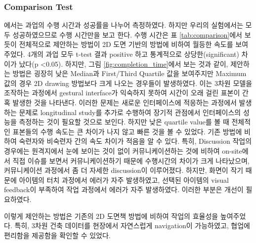 \subsubsection{Comparison Test}
\cite{yeh_-site_2012}에서는 과업의 수행 시간과 성공률을 나누어 측정하였다. 하지만 우리의 실험에서는 모두 성공하였으므로 수행 시간만을 보고 한다. 수행 시간은 표 \ref{tab:comparison}에서 보듯이 전체적으로 제안하는 방법이 2D 도면 기반의 방법에 비하여 월등한 속도를 보여주었다. 4개의 과업 모두 t-test 결과 positive 하고 통계적으로 상당한(significant) 차이가 났다(p \textless 0.05). 하지만, 그림 \ref{fig:completion_time}에서 보는 것과 같이, 제안하는 방법은 굉장히 낮은 Median과 First/Third Quartile 값을 보여주지만 Maximum 값의 경우 2D drawing 방법보다 크게 나오는 경우들이 발생하였다. 이는 3차원 모델을 조작하는 과정에서 gestural interface가 익숙하지 못하여 시간이 오래 걸린 표본이 간혹 발생한 것을 나타낸다. 이러한 문제는 새로운 인터페이스에 적응하는 과정에서 발생하는 문제로 longitudinal study를 추가로 수행하여 장기적 관점에서 인터페이스의 성능을 측정하는 것이 필요할 것으로 보인다. 하지만 낮은 quartile value를 볼 때 전체적인 표본들의 수행 속도는 큰 차이가 나지 않고 빠른 것을 볼 수 있었다. 기존 방법에 비하여 숙련자와 비숙련자 간의 속도 차이가 적음을 알 수 있다. 
특히, Discussion 작업의 경우에는 원격지에서 눈에 보이는 것이 없이 커뮤니케이션하는 것에 비하여 on-site에서 직접 이슈를 보면서 커뮤니케이션하기 때문에 수행시간의 차이가 크게 나타났으며, 커뮤니케이션 과정에서 좀 더 자세한 discussion이 이루어졌다. 하지만, 화면이 작기 때문에 아이템의 터치 과정에서 에러가 자주 발생하였고, 선택된 아이템의 visual feedback이 부족하여 작업 과정에서 에러가 자주 발생하였다. 이러한 부분은 개선이 필요하였다. 

이렇게 제안하는 방법은 기존의 2D 도면책 방법에 비하여 작업의 효율성을 높여주었다. 특히, 3차원 건축 데이터를 현장에서 자연스럽게 navigation이 가능하였고, 협업에 편리함을 제공함을 확인할 수 있었다.

\renewcommand{\multirowsetup}{\centering}  %
\renewcommand{\arraystretch}{1.2} 

